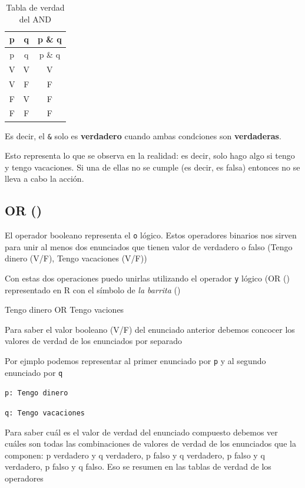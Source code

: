 \documentclass[
]{book}
\begin{document}
\begin{longtable}[]{@{}ccc@{}}
\caption{Tabla de verdad del AND}\tabularnewline
\toprule\noalign{}
p & q & p \& q \\
\midrule\noalign{}
\endfirsthead
\toprule\noalign{}
p & q & p \& q \\
\midrule\noalign{}
\endhead
\bottomrule\noalign{}
\endlastfoot
V & V & V \\
V & F & F \\
F & V & F \\
F & F & F \\
\end{longtable}

Es decir, el \texttt{\&} solo es \textbf{verdadero} cuando ambas condciones son \textbf{verdaderas}.

Esto representa lo que se observa en la realidad: es decir, solo hago algo si tengo y tengo vacaciones. Si una de ellas no se cumple (es decir, es falsa) entonces no se lleva a cabo la acción.

\hypertarget{or}{%
\subsection{OR (\textbar)}\label{or}}

El operador booleano \texttt{\textbar{}} representa el \texttt{o} lógico. Estos operadores binarios nos sirven para unir al menos dos enunciados que tienen valor de verdadero o falso (Tengo dinero (V/F), Tengo vacaciones (V/F))

Con estas dos operaciones puedo unirlas utilizando el operador \texttt{y} lógico (OR (\texttt{\textbar{}}) representado en R con el símbolo de \emph{la barrita} (\texttt{\textbar{}})

Tengo dinero OR Tengo vaciones

Para saber el valor booleano (V/F) del enunciado anterior debemos concocer los valores de verdad de los enunciados por separado

Por ejmplo podemos representar al primer enunciado por \texttt{p} y al segundo enunciado por \texttt{q}

\texttt{p:\ Tengo\ dinero}

\texttt{q:\ Tengo\ vacaciones}

Para saber cuál es el valor de verdad del enunciado compuesto debemos ver cuáles son todas las combinaciones de valores de verdad de los enunciados que la componen: p verdadero y q verdadero, p falso y q verdadero, p falso y q verdadero, p falso y q falso. Eso se resumen en las tablas de verdad de los operadores
\end{document}

